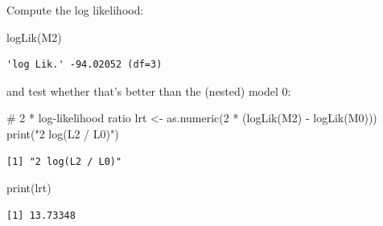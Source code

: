 \documentclass[
  letterpaper,
  DIV=11,
  numbers=noendperiod]{scrreprt}
\newenvironment{Shaded}{\begin{snugshade}}{\end{snugshade}}
\newcommand{\CommentTok}[1]{\textcolor[rgb]{0.37,0.37,0.37}{#1}}
\newcommand{\DecValTok}[1]{\textcolor[rgb]{0.68,0.00,0.00}{#1}}
\newcommand{\FunctionTok}[1]{\textcolor[rgb]{0.28,0.35,0.67}{#1}}
\newcommand{\NormalTok}[1]{\textcolor[rgb]{0.00,0.23,0.31}{#1}}
\newcommand{\OtherTok}[1]{\textcolor[rgb]{0.00,0.23,0.31}{#1}}
\newcommand{\SpecialCharTok}[1]{\textcolor[rgb]{0.37,0.37,0.37}{#1}}
\newcommand{\StringTok}[1]{\textcolor[rgb]{0.13,0.47,0.30}{#1}}
\begin{document}
Compute the log likelihood:

\begin{Shaded}
\begin{Highlighting}[]
\FunctionTok{logLik}\NormalTok{(M2)}
\end{Highlighting}
\end{Shaded}

\begin{verbatim}
'log Lik.' -94.02052 (df=3)
\end{verbatim}

and test whether that's better than the (nested) model 0:

\begin{Shaded}
\begin{Highlighting}[]
\CommentTok{\# 2 * log{-}likelihood ratio}
\NormalTok{lrt }\OtherTok{\textless{}{-}} \FunctionTok{as.numeric}\NormalTok{(}\DecValTok{2} \SpecialCharTok{*}\NormalTok{ (}\FunctionTok{logLik}\NormalTok{(M2) }\SpecialCharTok{{-}} \FunctionTok{logLik}\NormalTok{(M0)))}
\FunctionTok{print}\NormalTok{(}\StringTok{"2 log(L2 / L0)"}\NormalTok{)}
\end{Highlighting}
\end{Shaded}

\begin{verbatim}
[1] "2 log(L2 / L0)"
\end{verbatim}

\begin{Shaded}
\begin{Highlighting}[]
\FunctionTok{print}\NormalTok{(lrt)}
\end{Highlighting}
\end{Shaded}

\begin{verbatim}
[1] 13.73348
\end{verbatim}

\begin{Shaded}
\end{Shaded}
\end{document}
